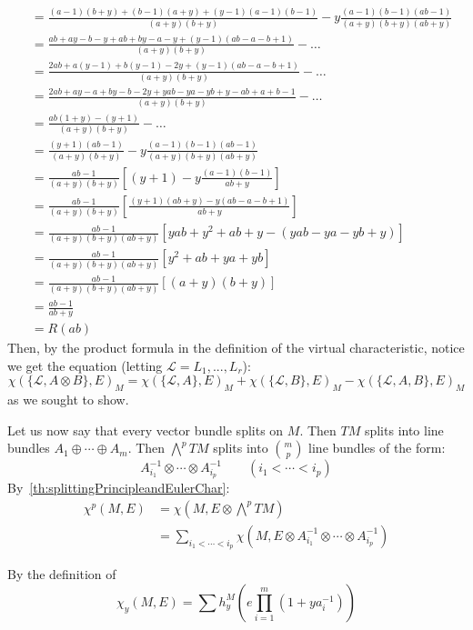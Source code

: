 \documentclass{book}
\newcommand{\CL}{{\mathcal{L}}}
\begin{document}
\begin{Proof}
\begin{align*}
  &= \frac{(a-1)(b+y) + (b-1)(a+y) + (y-1)(a-1)(b-1)}{(a+y)(b+y)} - y \frac{(a-1)(b-1)(ab-1)}{(a+y)(b+y)(ab+y)} \\
  &= \frac{ab+ay-b-y + ab+by-a-y + (y-1)(ab-a-b+1)}{(a+y)(b+y)} - \dots \\
  &= \frac{2ab+a(y-1)+b(y-1)-2y + (y-1)(ab-a-b+1)}{(a+y)(b+y)} - \dots \\
  &= \frac{2ab+ay-a+by-b-2y + yab-ya-yb+y-ab+a+b-1}{(a+y)(b+y)} - \dots \\
  &= \frac{ab(1+y) - (y+1)}{(a+y)(b+y)} - \dots \\
  &= \frac{(y+1)(ab-1)}{(a+y)(b+y)} - y \frac{(a-1)(b-1)(ab-1)}{(a+y)(b+y)(ab+y)} \\
  &= \frac{ab-1}{(a+y)(b+y)} \left[ (y+1) - y \frac{(a-1)(b-1)}{ab+y} \right] \\
  &= \frac{ab-1}{(a+y)(b+y)} \left[ \frac{(y+1)(ab+y) - y(ab-a-b+1)}{ab+y} \right] \\
  &= \frac{ab-1}{(a+y)(b+y)(ab+y)} \left[ yab+y^2+ab+y - (yab-ya-yb+y) \right] \\
  &= \frac{ab-1}{(a+y)(b+y)(ab+y)} \left[ y^2+ab+ya+yb \right] \\
  &= \frac{ab-1}{(a+y)(b+y)(ab+y)} \left[ (a+y)(b+y) \right] \\
  &= \frac{ab-1}{ab+y} \\
  &= R(ab)
  \end{align*}
  Then, by the product formula in the definition of the virtual characteristic, notice we get the equation (letting $\CL = L_1, ..., L_r$):
\[
  \chi(\{\CL, A\otimes B\}, E)_M = \chi(\{\CL,A\}, E)_M + \chi(\{\CL, B\}, E)_M - \chi(\{\CL, A,B\}, E)_M
\]
  as we sought to show.
\end{Proof}

Let us now say that every vector bundle splits on $M$. Then $TM$ splits into line bundles $A_1\oplus \cdots
\oplus A_m$. Then $\bigwedge^p TM$ splits into $\binom{m}{p}$ line bundles of the form:
\[
  A_{i_1}^{-1}\otimes \cdots \otimes A_{i_p}^{-1} \qquad (i_1 < \cdots < i_p)
\]
By~\cref{th:splittingPrincipleandEulerChar}:
\begin{align*}
  \chi^p(M, E) &= \chi(M, E\otimes \bigwedge^p TM)\\
               &= \sum_{i_1 < \cdots < i_p} \chi(M, E\otimes A_{i_1}^{-1}\otimes \cdots \otimes A_{i_p}^{-1})
\end{align*}

  By the definition of
\[
  \chi_y(M, E) = \sum h_y^M \left(e \prod_{i=1}^m (1+ya_i^{-1})\right)
\]
\end{document}
